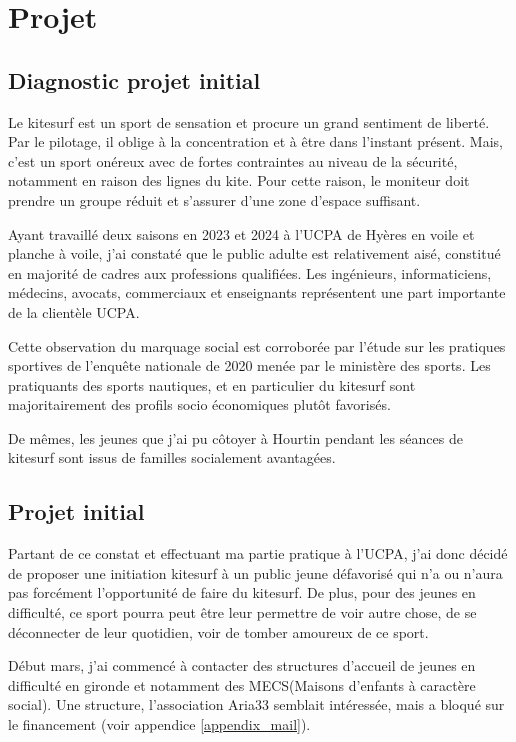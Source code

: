 \documentclass[11pt,a4paper]{report}
\begin{document}
\FloatBarrier
\section{Projet}
\subsection{Diagnostic projet initial}

Le kitesurf est un sport de sensation et procure un grand
sentiment de liberté. Par le pilotage, il oblige à 
la concentration et à \^etre dans l'instant présent.
Mais, c'est un sport onéreux avec de fortes contraintes
au niveau de la sécurité, notamment en raison des lignes du kite.
Pour cette raison, le moniteur doit prendre un groupe réduit
et s'assurer d'une zone  d'espace suffisant. 

Ayant travaillé deux saisons en 2023 et 2024 à l'UCPA de Hyères en voile
et planche à voile, j'ai  constaté que le public adulte est relativement
aisé, constitué en majorité de cadres aux professions qualifiées. Les
ingénieurs, informaticiens, médecins, avocats, commerciaux et enseignants
représentent une part importante de la clientèle UCPA.

Cette observation du marquage social  est corroborée par l'étude sur 
les pratiques sportives de l'enqu\^ete nationale de
2020 menée par le ministère des sports\cite{injep}. Les pratiquants
des sports nautiques, et en particulier du kitesurf sont majoritairement
des profils socio économiques plut\^ot favorisés.

De m\^emes, les jeunes que j'ai pu côtoyer à Hourtin
pendant les séances de kitesurf sont  issus de
familles socialement avantagées.

\subsection{Projet initial}
Partant de ce constat et effectuant ma partie pratique à l'UCPA,
j'ai donc décidé de proposer une initiation kitesurf à  un public jeune
défavorisé qui n'a ou n'aura pas forcément l'opportunité de faire du kitesurf. 
De plus, pour des jeunes en difficulté, ce sport pourra peut être 
leur permettre de voir autre chose, de se déconnecter de leur quotidien,
voir de tomber amoureux de ce sport.

Début mars, j'ai commencé à contacter des structures d'accueil de jeunes 
en difficulté en gironde et notamment des MECS(Maisons d'enfants à caractère social).
Une structure, l'association Aria33\cite{aria33} semblait 
intéressée, mais a bloqué sur le financement
(voir appendice \ref{appendix_mail}).
\end{document}
